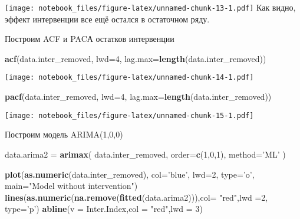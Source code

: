 \documentclass[
]{article}
\newenvironment{Shaded}{\begin{snugshade}}{\end{snugshade}}
\newcommand{\DataTypeTok}[1]{\textcolor[rgb]{0.13,0.29,0.53}{#1}}
\newcommand{\DecValTok}[1]{\textcolor[rgb]{0.00,0.00,0.81}{#1}}
\newcommand{\KeywordTok}[1]{\textcolor[rgb]{0.13,0.29,0.53}{\textbf{#1}}}
\newcommand{\NormalTok}[1]{#1}
\newcommand{\StringTok}[1]{\textcolor[rgb]{0.31,0.60,0.02}{#1}}
\begin{document}
\texttt{[image: notebook\_files/figure-latex/unnamed-chunk-13-1.pdf]} Как
видно, эффект интервенции все ещё остался в остаточном ряду.

Построим ACF и PACА остатков интервенции

\begin{Shaded}
\begin{Highlighting}[]
\KeywordTok{acf}\NormalTok{(data.inter_removed, }\DataTypeTok{lwd=}\DecValTok{4}\NormalTok{, }\DataTypeTok{lag.max=}\KeywordTok{length}\NormalTok{(data.inter_removed))}
\end{Highlighting}
\end{Shaded}

\texttt{[image: notebook\_files/figure-latex/unnamed-chunk-14-1.pdf]}

\begin{Shaded}
\begin{Highlighting}[]
\KeywordTok{pacf}\NormalTok{(data.inter_removed, }\DataTypeTok{lwd=}\DecValTok{4}\NormalTok{, }\DataTypeTok{lag.max=}\KeywordTok{length}\NormalTok{(data.inter_removed))}
\end{Highlighting}
\end{Shaded}

\texttt{[image: notebook\_files/figure-latex/unnamed-chunk-15-1.pdf]}

Построим модель ARIMA(1,0,0)

\begin{Shaded}
\begin{Highlighting}[]
\NormalTok{data.arima2 =}\StringTok{ }\KeywordTok{arimax}\NormalTok{(}
\NormalTok{  data.inter_removed,}
  \DataTypeTok{order=}\KeywordTok{c}\NormalTok{(}\DecValTok{1}\NormalTok{,}\DecValTok{0}\NormalTok{,}\DecValTok{1}\NormalTok{),}
  \DataTypeTok{method=}\StringTok{'ML'}
\NormalTok{)}

\KeywordTok{plot}\NormalTok{(}\KeywordTok{as.numeric}\NormalTok{(data.inter_removed), }\DataTypeTok{col=}\StringTok{'blue'}\NormalTok{, }\DataTypeTok{lwd=}\DecValTok{2}\NormalTok{, }\DataTypeTok{type=}\StringTok{'o'}\NormalTok{, }\DataTypeTok{main=}\StringTok{"Model without intervention"}\NormalTok{)}
\KeywordTok{lines}\NormalTok{(}\KeywordTok{as.numeric}\NormalTok{(}\KeywordTok{na.remove}\NormalTok{(}\KeywordTok{fitted}\NormalTok{(data.arima2))),}\DataTypeTok{col=} \StringTok{"red"}\NormalTok{,}\DataTypeTok{lwd =}\DecValTok{2}\NormalTok{, }\DataTypeTok{type=}\StringTok{'p'}\NormalTok{)}
\KeywordTok{abline}\NormalTok{(}\DataTypeTok{v =}\NormalTok{ Inter.Index,}\DataTypeTok{col =} \StringTok{"red"}\NormalTok{,}\DataTypeTok{lwd =} \DecValTok{3}\NormalTok{)}
\end{Highlighting}
\end{Shaded}
\end{document}
